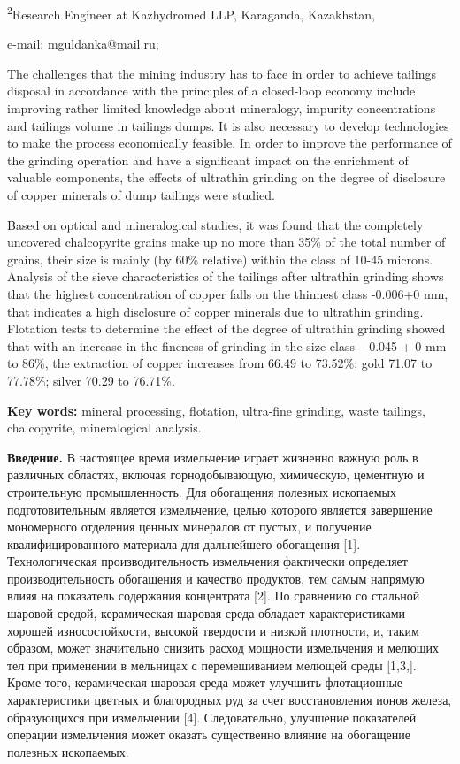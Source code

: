 \textsuperscript{2}Research Engineer at Kazhydromed LLP, Karaganda,
Kazakhstan,

e-mail: mguldanka@mail.ru;

The challenges that the mining industry has to face in order to achieve
tailings disposal in accordance with the principles of a closed-loop
economy include improving rather limited knowledge about mineralogy,
impurity concentrations and tailings volume in tailings dumps. It is
also necessary to develop technologies to make the process economically
feasible. In order to improve the performance of the grinding operation
and have a significant impact on the enrichment of valuable components,
the effects of ultrathin grinding on the degree of disclosure of copper
minerals of dump tailings were studied.

Based on optical and mineralogical studies, it was found that the
completely uncovered chalcopyrite grains make up no more than 35\% of
the total number of grains, their size is mainly (by 60\% relative)
within the class of 10-45 microns. Analysis of the sieve characteristics
of the tailings after ultrathin grinding shows that the highest
concentration of copper falls on the thinnest class -0.006+0 mm, that
indicates a high disclosure of copper minerals due to ultrathin
grinding. Flotation tests to determine the effect of the degree of
ultrathin grinding showed that with an increase in the fineness of
grinding in the size class -- 0.045 + 0 mm to 86\%, the extraction of
copper increases from 66.49 to 73.52\%; gold 71.07 to 77.78\%; silver
70.29 to 76.71\%.

{\bfseries Key words:} mineral processing, flotation, ultra-fine grinding,
waste tailings, chalcopyrite, mineralogical analysis.

{\bfseries Введение.} В настоящее время измельчение играет жизненно важную
роль в различных областях, включая горнодобывающую, химическую,
цементную и строительную промышленность. Для обогащения полезных
ископаемых подготовительным является измельчение, целью которого
является завершение мономерного отделения ценных минералов от пустых, и
получение квалифицированного материала для дальнейшего обогащения
{[}1{]}. Технологическая производительность измельчения фактически
определяет производительность обогащения и качество продуктов, тем самым
напрямую влияя на показатель содержания концентрата {[}2{]}. По
сравнению со стальной шаровой средой, керамическая шаровая среда
обладает характеристиками хорошей износостойкости, высокой твердости и
низкой плотности, и, таким образом, может значительно снизить расход
мощности измельчения и мелющих тел при применении в мельницах с
перемешиванием мелющей среды {[}1,3,{]}. Кроме того, керамическая
шаровая среда может улучшить флотационные характеристики цветных и
благородных руд за счет восстановления ионов железа, образующихся при
измельчении {[}4{]}. Следовательно, улучшение показателей операции
измельчения может оказать существенно влияние на обогащение полезных
ископаемых.


